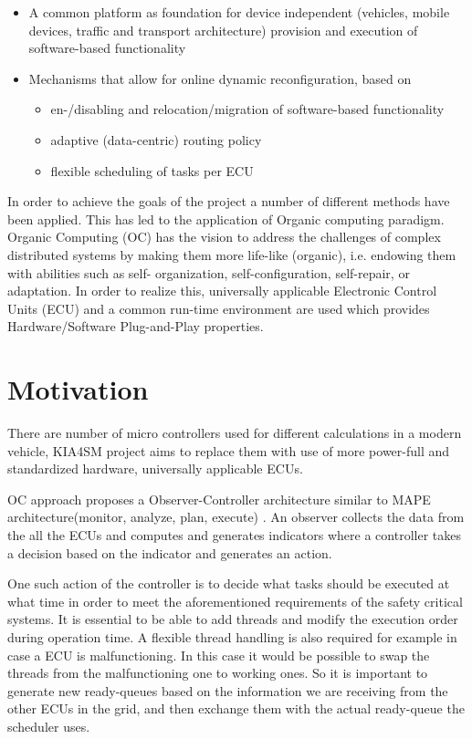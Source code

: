 \begin{itemize}
\item A common platform as foundation for device independent (vehicles, mobile devices, traffic and
transport architecture) provision and execution of software-based functionality
\item Mechanisms that allow for online dynamic reconfiguration, based on
\begin{itemize}
\item en-/disabling and relocation/migration of
software-based functionality
\item adaptive (data-centric) routing policy
\item flexible scheduling of tasks per ECU
\end{itemize}
\end{itemize}

In order to achieve the goals of the project a number of different methods have been applied. This has led to the application of Organic computing paradigm.
Organic Computing (OC) has the vision to address the
challenges of complex distributed systems by making them more
life-like (organic), i.e. endowing them with abilities such as self-
organization, self-configuration, self-repair, or adaptation.
In order to realize this, universally applicable Electronic Control Units (ECU) and a common run-time environment are used which provides Hardware/Software Plug-and-Play properties.

\section{Motivation}

There are number of micro controllers used for different calculations in a modern vehicle, KIA4SM project aims to replace them with use of more power-full and standardized hardware, universally applicable ECUs. 

OC approach proposes a Observer-Controller architecture similar to MAPE architecture(monitor, analyze, plan, execute) . An observer collects the data from the all the ECUs and computes and generates indicators where a controller takes a decision based on the indicator and generates an action.

One such action of the controller is to decide what tasks should be executed at what time in order to meet the aforementioned requirements of the safety critical systems. It is essential to be able to add threads and modify the execution order during operation time.
A flexible thread handling is also required for example in case 
a ECU is malfunctioning. In this case it would be possible to swap the threads from the 
malfunctioning one to working ones. So it is important to generate new ready-queues 
based on the information we are receiving from the other ECUs in the grid, and then 
exchange them with the actual ready-queue the scheduler uses. 

